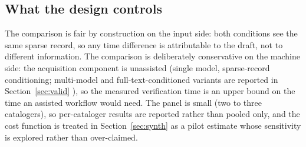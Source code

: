 \subsection{What the design controls}

The comparison is fair by construction on the input side: both conditions
see the same sparse record, so any time difference is attributable to the
draft, not to different information. The comparison is deliberately
conservative on the machine side: the acquisition component is unassisted
(single model, sparse-record conditioning; multi-model and
full-text-conditioned variants are reported in Section~\ref{sec:valid}
), so the measured verification time is an upper bound on the
time an assisted workflow would need. The panel is small (two to three
catalogers), so per-cataloger results are reported rather than pooled only,
and the cost function is treated in Section~\ref{sec:synth} as a pilot
estimate whose sensitivity is explored rather than over-claimed.
